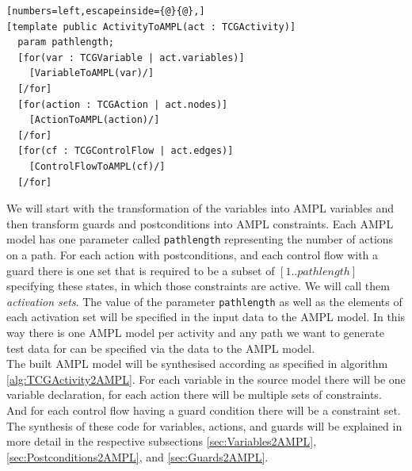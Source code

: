 \begin{algorithm}
\begin{lstlisting}[numbers=left,escapeinside={@}{@},]
[template public ActivityToAMPL(act : TCGActivity)]
  param pathlength;
  [for(var : TCGVariable | act.variables)]
    [VariableToAMPL(var)/]
  [/for]
  [for(action : TCGAction | act.nodes)]
    [ActionToAMPL(action)/]
  [/for]
  [for(cf : TCGControlFlow | act.edges)]
    [ControlFlowToAMPL(cf)/]
  [/for]
\end{lstlisting}
\caption{Model to text transformation from TCGActivity to AMPL model}
\label{alg:TCGActivity2AMPL}
\end{algorithm}
We will start with the transformation of the variables into AMPL variables and then transform guards and postconditions into AMPL constraints. Each AMPL model has one parameter called \texttt{pathlength} representing the number of actions on a path. For each action with postconditions, and each control flow with a guard there is one set that is required to be a subset of $[1..pathlength]$ specifying these states, in which those constraints are active. We will call them \emph{activation sets}. The value of the parameter \texttt{pathlength} as well as the elements of each activation set will be specified in the input data to the AMPL model. In this way there is one AMPL model per activity and any path we want to generate test data for can be specified via the data to the AMPL model.\\
The built AMPL model will be synthesised according as specified in algorithm \ref{alg:TCGActivity2AMPL}. For each variable in the source model there will be one variable declaration, for each action there will be multiple sets of constraints. And for each control flow having a guard condition there will be a constraint set. The synthesis of these code for variables, actions, and guards will be explained in more detail in the respective subsections \ref{sec:Variables2AMPL}, \ref{sec:Postconditions2AMPL}, and \ref{sec:Guards2AMPL}.

